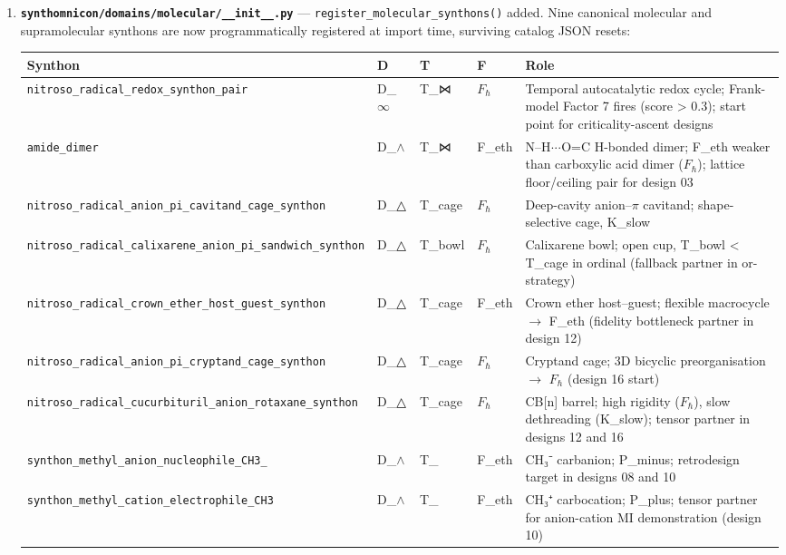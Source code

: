 \documentclass[12pt,a4paper]{article}
\begin{document}
\begin{enumerate}
    \item 
    \textbf{\texttt{synthomnicon/domains/molecular/\_\_init\_\_.py}} --- \texttt{register\_molecular\_synthons()} added. Nine canonical molecular and supramolecular synthons are now programmatically registered at import time, surviving catalog JSON resets:

    \begin{table}[htbp]
\centering
\small
{}
\begin{tabularx}{\textwidth}{>{\centering\arraybackslash}X >{\centering\arraybackslash}X >{\centering\arraybackslash}X >{\centering\arraybackslash}X >{\centering\arraybackslash}X}
\toprule
\rowcolor{gray!25}\textbf{Synthon} & \textbf{D} & \textbf{T} & \textbf{F} & \textbf{Role} \\
\midrule
\rowcolors{1}{white}{gray!10}
\texttt{nitroso\_radical\_redox\_synthon\_pair} & D\_$\infty$ & T\_⋈ & $F_{\hbar}$ & Temporal autocatalytic redox cycle; Frank-model Factor 7 fires (score \textgreater{} 0.3); start point for criticality-ascent designs \\
\texttt{amide\_dimer} & D\_$\land$ & T\_⋈ & F\_eth & N--H$\cdot$$\cdot$$\cdot$O=C H-bonded dimer; F\_eth weaker than carboxylic acid dimer ($F_{\hbar}$); lattice floor/ceiling pair for design 03 \\
\texttt{nitroso\_radical\_anion\_pi\_cavitand\_cage\_synthon} & D\_△ & T\_cage & $F_{\hbar}$ & Deep-cavity anion--$\pi$ cavitand; shape-selective cage, K\_slow \\
\texttt{nitroso\_radical\_calixarene\_anion\_pi\_sandwich\_synthon} & D\_△ & T\_bowl & $F_{\hbar}$ & Calixarene bowl; open cup, T\_bowl \textless{} T\_cage in ordinal (fallback partner in or-strategy) \\
\texttt{nitroso\_radical\_crown\_ether\_host\_guest\_synthon} & D\_△ & T\_cage & F\_eth & Crown ether host--guest; flexible macrocycle $\rightarrow$ F\_eth (fidelity bottleneck partner in design 12) \\
\texttt{nitroso\_radical\_anion\_pi\_cryptand\_cage\_synthon} & D\_△ & T\_cage & $F_{\hbar}$ & Cryptand cage; 3D bicyclic preorganisation $\rightarrow$ $F_{\hbar}$ (design 16 start) \\
\texttt{nitroso\_radical\_cucurbituril\_anion\_rotaxane\_synthon} & D\_△ & T\_cage & $F_{\hbar}$ & CB{[}n{]} barrel; high rigidity ($F_{\hbar}$), slow dethreading (K\_slow); tensor partner in designs 12 and 16 \\
\texttt{synthon\_methyl\_anion\_nucleophile\_CH3\_} & D\_$\land$ & T\_\textbar{} & F\_eth & CH₃⁻ carbanion; P\_minus; retrodesign target in designs 08 and 10 \\
\texttt{synthon\_methyl\_cation\_electrophile\_CH3} & D\_$\land$ & T\_\textbar{} & F\_eth & CH₃⁺ carbocation; P\_plus; tensor partner for anion-cation MI demonstration (design 10) \\
\bottomrule
\end{tabularx}
\end{table}


\end{enumerate}
\end{document}
